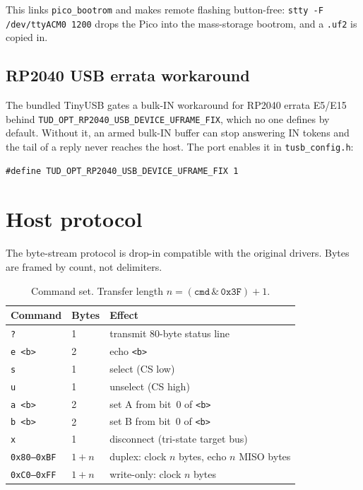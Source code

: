 \documentclass[11pt,a4paper]{article}
\begin{document}
This links \texttt{pico\_bootrom} and makes remote flashing button-free:
\texttt{stty -F /dev/ttyACM0 1200} drops the Pico into the mass-storage
bootrom, and a \texttt{.uf2} is copied in.

\subsection{RP2040 USB errata workaround}

The bundled TinyUSB gates a bulk-IN workaround for RP2040 errata
E5/E15 behind \texttt{TUD\_OPT\_RP2040\_USB\_DEVICE\_UFRAME\_FIX}, which no
one defines by default. Without it, an armed bulk-IN buffer can stop
answering IN tokens and the tail of a reply never reaches the host. The port
enables it in \texttt{tusb\_config.h}:

\begin{lstlisting}[style=c]
#define TUD_OPT_RP2040_USB_DEVICE_UFRAME_FIX 1
\end{lstlisting}

\section{Host protocol}

The byte-stream protocol is drop-in compatible with the original drivers.
Bytes are framed by count, not delimiters.

\begin{table}[h!]
\centering
\begin{tabular}{@{}lll@{}}
\toprule
\textbf{Command} & \textbf{Bytes} & \textbf{Effect}\\
\midrule
\texttt{?}        & 1        & transmit 80-byte status line\\
\texttt{e <b>}    & 2        & echo \texttt{<b>}\\
\texttt{s}        & 1        & select (CS low)\\
\texttt{u}        & 1        & unselect (CS high)\\
\texttt{a <b>}    & 2        & set A from bit~0 of \texttt{<b>}\\
\texttt{b <b>}    & 2        & set B from bit~0 of \texttt{<b>}\\
\texttt{x}        & 1        & disconnect (tri-state target bus)\\
\texttt{0x80--0xBF} & $1+n$  & duplex: clock $n$ bytes, echo $n$ MISO bytes\\
\texttt{0xC0--0xFF} & $1+n$  & write-only: clock $n$ bytes\\
\bottomrule
\end{tabular}
\caption{Command set. Transfer length $n = (\texttt{cmd} \,\&\, \texttt{0x3F})+1$.}
\label{tab:proto}
\end{table}
\end{document}

